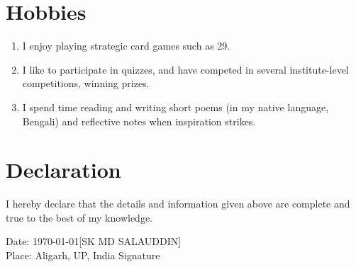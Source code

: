 \documentclass{article}
\begin{document}
\section{Hobbies}
\begin{enumerate}[label=(\alph*)]
\item I enjoy playing strategic card games such as 29.
\item I like to participate in quizzes, and have competed in several institute-level competitions, winning prizes.
\item I spend time reading and writing short poems (in my native language, Bengali) and reflective notes when inspiration strikes.
\end{enumerate}
\section{Declaration}
I hereby declare that the details and information given above are complete and true to the best of my knowledge.
\par\vspace{1.5cm}
\noindent Date: \today \hfill [SK MD SALAUDDIN]\\
Place: Aligarh, UP, India \hfill Signature\hspace{1cm}
\end{document}
